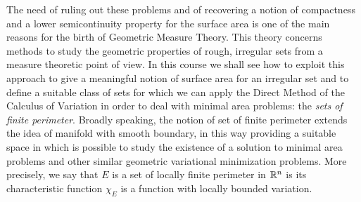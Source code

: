The need of ruling out these problems and of recovering a notion of compactness and a lower semicontinuity property for the surface area is one of the main reasons for the birth of Geometric Measure Theory. This theory concerns methods to study the geometric properties of rough, irregular sets from a measure theoretic point of view. In this course we shall see how to exploit this approach to give a meaningful notion of surface area for an irregular set and to define a suitable class of sets for which we can apply the Direct Method of the Calculus of Variation in order to deal with minimal area problems: the {\em sets of finite perimeter}. Broadly speaking, the notion of set of finite perimeter extends the idea of manifold with smooth boundary, in this way providing a suitable space in which is possible to study the existence of a solution to minimal area problems and other similar geometric variational minimization problems. More precisely, we say that $E$ is a set of locally finite perimeter in $\mathbb{R}^{n}$ is its characteristic function $\chi_{E}$ is a function with locally bounded variation.


